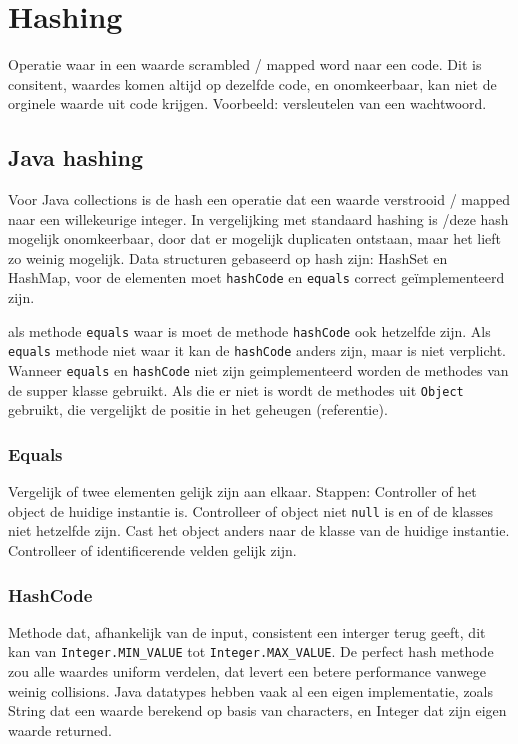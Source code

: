 \section{Hashing}
Operatie waar in een waarde scrambled / mapped word naar een code.
Dit is consitent, waardes komen altijd op dezelfde code, en onomkeerbaar, kan niet de orginele waarde uit code krijgen.
Voorbeeld: versleutelen van een wachtwoord.

\subsection{Java hashing}
Voor Java collections is de hash een operatie dat een waarde verstrooid / mapped naar een willekeurige integer.
In vergelijking met standaard hashing is /deze hash mogelijk onomkeerbaar, door dat er mogelijk duplicaten ontstaan, maar het lieft zo weinig mogelijk.
Data structuren gebaseerd op hash zijn: HashSet en HashMap, voor de elementen moet \texttt{hashCode} en \texttt{equals} correct geïmplementeerd zijn.

als methode \texttt{equals} waar is moet de methode \texttt{hashCode} ook hetzelfde zijn.
Als \texttt{equals} methode niet waar it kan de \texttt{hashCode} anders zijn, maar is niet verplicht.
Wanneer \texttt{equals} en \texttt{hashCode} niet zijn geimplementeerd worden de methodes van de supper klasse gebruikt.
Als die er niet is wordt de methodes uit \texttt{Object} gebruikt, die vergelijkt de positie in het geheugen (referentie).

\subsubsection{Equals}
Vergelijk of twee elementen gelijk zijn aan elkaar.
Stappen:
Controller of het object de huidige instantie is.
Controlleer of object niet \texttt{null} is en of de klasses niet hetzelfde zijn.
Cast het object anders naar de klasse van de huidige instantie.
Controlleer of identificerende velden gelijk zijn.

\subsubsection{HashCode}
Methode dat, afhankelijk van de input, consistent een interger terug geeft, dit kan van \texttt{Integer.MIN\_VALUE} tot \texttt{Integer.MAX\_VALUE}.
De perfect hash methode zou alle waardes uniform verdelen, dat levert een betere performance vanwege weinig collisions.
Java datatypes hebben vaak al een eigen implementatie, zoals String dat een waarde berekend op basis van characters, en Integer dat zijn eigen waarde returned.

